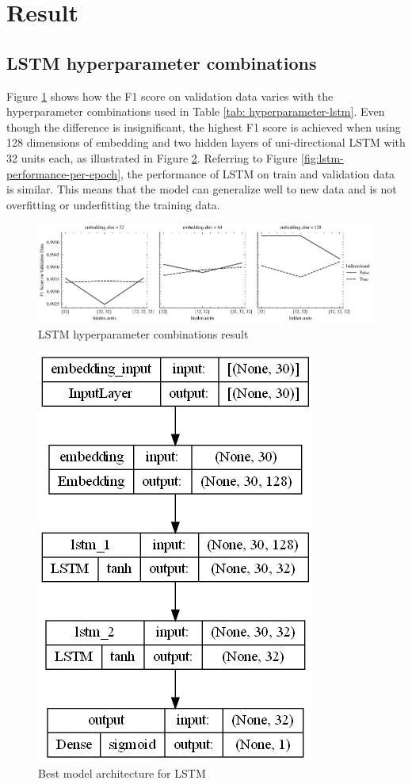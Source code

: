 \section{Result}
\label{sec:result}

\subsection{LSTM hyperparameter combinations}
\label{subsec:lstm-hyperparameter-combinations}
\par Figure \ref{fig:lstm-tuning} shows how the F1 score on validation data varies with the hyperparameter combinations used in Table \ref{tab: hyperparameter-lstm}. Even though the difference is insignificant, the highest F1 score is achieved when using 128 dimensions of embedding and two hidden layers of uni-directional LSTM with 32 units each, as illustrated in Figure \ref{fig:best-model-architecture}. Referring to Figure \ref{fig:lstm-performance-per-epoch}, the performance of LSTM on train and validation data is similar. This means that the model can generalize well to new data and is not overfitting or underfitting the training data.

\begin{figure}[!h]
  \centering
  \includegraphics[width=.5\textwidth]{image/lstm_hyperparameter_tuning.png}
  \caption{LSTM hyperparameter combinations result}
  \label{fig:lstm-tuning}
\end{figure}

\begin{figure}[!h]
  \centering
  \includegraphics[width=.26\textwidth]{image/lstm_best_model_architecture.png}
  \caption{Best model architecture for LSTM}
  \label{fig:best-model-architecture}
\end{figure}

